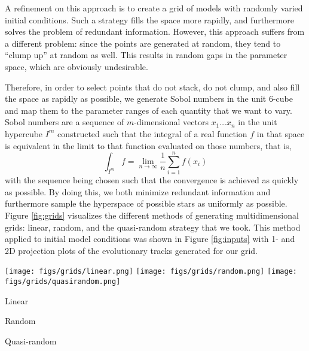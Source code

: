 \documentclass[twocolumn,twocolappendix]{aastex6}
\begin{document}
A refinement on this approach is to create a grid of models with randomly varied initial conditions. Such a strategy fills the space more rapidly, and furthermore solves the problem of redundant information. However, this approach suffers from a different problem: since the points are generated at random, they tend to ``clump up'' at random as well. This results in random gaps in the parameter space, which are obviously undesirable. 

Therefore, in order to select points that do not stack, do not clump, and also fill the space as rapidly as possible, we generate Sobol numbers \citep{sobol1967distribution} in the unit 6-cube and map them to the parameter ranges of each quantity that we want to vary. Sobol numbers are a sequence of $m$-dimensional vectors $x_1 \ldots x_n$ in the unit hypercube $I^m$ constructed such that the integral of a real function $f$ in that space is equivalent in the limit to that function evaluated on those numbers, that is,
\begin{equation}
    \int_{I^m} f = \lim_{n \to \infty} \frac{1}{n}\sum_{i=1}^n f(x_i)
\end{equation}
with the sequence being chosen such that the convergence is achieved as quickly as possible. By doing this, we both minimize redundant information and furthermore sample the hyperspace of possible stars as uniformly as possible. Figure \ref{fig:grids} visualizes the different methods of generating multidimensional grids: linear, random, and the quasi-random strategy that we took. This method applied to initial model conditions was shown in Figure \ref{fig:inputs} with 1- and 2D projection plots of the evolutionary tracks generated for our grid. 

\begin{figure*}
    \centering
    \texttt{[image: figs/grids/linear.png]}\hfill
    \texttt{[image: figs/grids/random.png]}\hfill
    \texttt{[image: figs/grids/quasirandom.png]}\\
    \parbox{0.32\linewidth}{\centering Linear}\hfill
    \parbox{0.32\linewidth}{\centering Random}\hfill
    \parbox{0.32\linewidth}{\centering Quasi-random}
    \caption{Results of different methods for generating multidimensional grids portrayed via a unit cube projected onto a unit square. Linear (left), random (middle), and quasi-random (right) grids are generated in three dimensions, with color depicting the third dimension, i.e., the distance between the reader and the screen. From top to bottom, all three methods are shown with 100, 400, and 2000 points generated, respectively. }%
    \label{fig:grids}
\end{figure*}
\end{document}
